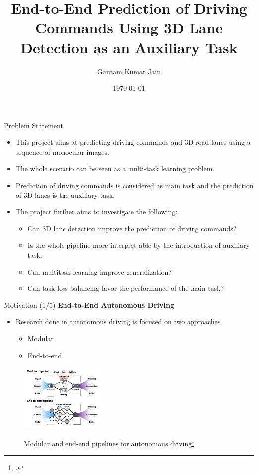 \documentclass[aspectratio=169]{beamer}
\author[Jain]{Gautam Kumar Jain}
\title{End-to-End Prediction of Driving
Commands Using 3D Lane Detection as an
Auxiliary Task}
\institute[HBRS]{Hochschule Bonn-Rhein-Sieg}
\date{\today}
\begin{document}
{
\begin{frame}
\titlepage
\end{frame}
}

\begin{frame}{Problem Statement}
    \begin{itemize}
        \item This project aims at predicting driving commands and 3D road lanes using a sequence of monocular images.
        \item The whole scenario can be seen as a multi-task learning problem.
        \item Prediction of driving commands is considered as main task and the prediction of 3D lanes is the auxiliary task.
        \item The project further aims to investigate the following: 
        \begin{itemize}
            \item Can 3D lane detection improve the prediction of driving commands? 
            \item Is the whole pipeline more interpret-able by the introduction of auxiliary task.
            \item Can multitask learning improve generalization? 
            \item Can task loss balancing favor the performance of the main task? 
        \end{itemize}
    \end{itemize}
\end{frame}

\begin{frame}{Motivation (1/5)}
  \textbf{End-to-End Autonomous Driving}
  \begin{itemize}
    \item Research done in autonomous driving is focused on two approaches
        \begin{itemize}
            \item Modular 
            \item End-to-end 
        \end{itemize}
        
  \end{itemize}
    \begin{figure}[H]
     \centering
     
\includegraphics[width=0.4\linewidth, height=3.2cm]{images/end-modular.png} 
\label{fig:subim1}

\caption{Modular and end-end pipelines for autonomous driving\footcite{DBLP:journals/corr/abs-2003-06404}}
\label{fig:image2}
\end{figure}
\end{frame}
\end{document}
